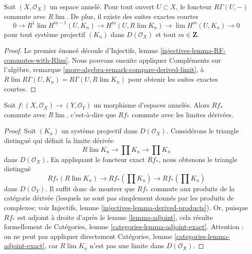 \begin{lemma}

\label{lemma-RGamma-commutes-with-Rlim}
Soit $(X, \mathcal{O}_X)$ un espace annelé. Pour tout ouvert $U \subset X$, le foncteur $R\Gamma(U, -)$ commute avec $R\lim$. De plus, il existe des suites exactes courtes $$
0 \to
R^1\lim H^{m - 1}(U, K_n) \to H^m(U, R\lim K_n) \to
\lim H^m(U, K_n) \to 0
$$ pour tout système projectif $(K_n)$ dans $D(\mathcal{O}_X)$ et tout $m \in \mathbf{Z}$.
\end{lemma}

\begin{proof}

Le premier énoncé découle d'Injectifs, lemme \ref{injectives-lemma-RF-commutes-with-Rlim}. Nous pouvons ensuite appliquer Compléments sur l'algèbre, remarque \ref{more-algebra-remark-compare-derived-limit},
à $R\lim R\Gamma(U, K_n) = R\Gamma(U, R\lim K_n)$ pour obtenir les suites exactes courtes.

\end{proof}

\begin{lemma}

\label{lemma-Rf-commutes-with-Rlim}

Soit $f : (X, \mathcal{O}_X) \to (Y, \mathcal{O}_Y)$ un morphisme d'espaces annelés. Alors $Rf_*$ commute avec $R\lim$, c'est-à-dire que $Rf_*$ commute avec les limites dérivées.

\end{lemma}

\begin{proof}

Soit $(K_n)$ un système projectif dans $D(\mathcal{O}_X)$. Considérons le triangle distingué qui définit la limite dérivée
$$
R\lim K_n \to \prod K_n \to \prod K_n
$$
dans $D(\mathcal{O}_X)$. En appliquant le foncteur exact $Rf_*$, nous obtenons le triangle distingué
$$
Rf_*(R\lim K_n) \to Rf_*\left(\prod K_n\right) \to Rf_*\left(\prod K_n\right)
$$
dans $D(\mathcal{O}_Y)$. Il suffit donc de montrer que
$Rf_*$ commute aux produits de la catégorie dérivée (lesquels ne sont pas simplement donnés par les produits de complexes; voir Injectifs, lemme \ref{injectives-lemma-derived-products}). Or, puisque $Rf_*$ est adjoint à droite d'après le lemme \ref{lemma-adjoint},
cela résulte formellement de Catégories, lemme \ref{categories-lemma-adjoint-exact}. Attention : on ne peut pas appliquer directement Catégories, lemme \ref{categories-lemma-adjoint-exact},
car $R\lim K_n$ n'est pas une limite dans $D(\mathcal{O}_X)$.

\end{proof}

